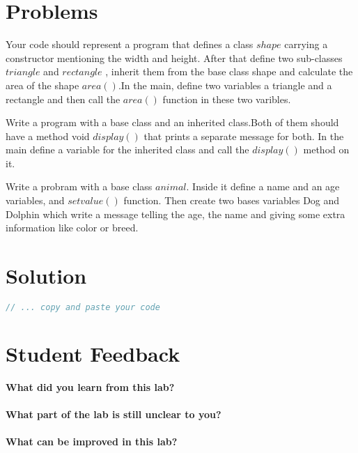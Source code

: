 \documentclass[11pt,fleqn]{book} %
\begin{document}
\section{Problems} 
\begin{problem}
  Your code should represent a program that defines a class $shape$ carrying a constructor mentioning the width and height. After that define two sub-classes $triangle$ and $rectangle$ , inherit them from the base class shape and calculate the area of the shape $area()$.In the main, define two variables a triangle and a rectangle and then call the $area()$ function in these two varibles.\\
\end{problem}
\begin{problem}
  Write a program with a base class and an inherited class.Both of them should have a method void $display()$ that prints a separate message for both. In the main define a variable for the inherited class and call the $display()$ method on it.\\
\end{problem}
\begin{problem}
  Write a probram with a base class $animal$. Inside it define a name and an age variables, and $setvalue()$ function. Then create two bases variables Dog and Dolphin which write a message telling the age, the name and giving some extra information like color or breed.
\end{problem}

\newpage
\section{Solution}
\begin{lstlisting}[language=C++]
  // ... copy and paste your code
\end{lstlisting}

\newpage
\section{Student Feedback}
\textbf{What did you learn from this lab?}\\
\noindent\fbox{\parbox{\textwidth}{
  }
}\\
\textbf{What part of the lab is still unclear to you?}\\
\noindent\fbox{\parbox{\textwidth}{
  }
}\\
\textbf{What can be improved in this lab?}\\ 
\noindent\fbox{\parbox{\textwidth}{
  }
}\\
\end{document}
